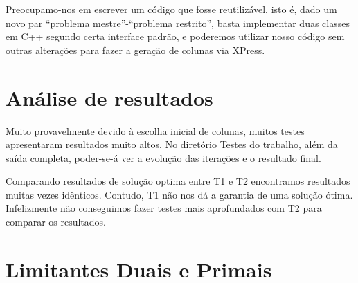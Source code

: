 \documentclass[letterpaper,11pt]{article}
\begin{document}
Preocupamo-nos em escrever um código que fosse reutilizável, isto é,
dado um novo par ``problema mestre''-``problema restrito'', basta
implementar duas classes em C++ segundo certa interface padrão, e
poderemos utilizar nosso código sem outras alterações para fazer a
geração de colunas via XPress.

\section{Análise de resultados}
Muito provavelmente devido à escolha inicial de colunas, muitos testes
apresentaram resultados muito altos. No diretório Testes do trabalho,
além da saída completa, poder-se-á ver a evolução das iterações e o
resultado final. 

Comparando resultados de solução optima entre T1 e T2 encontramos
resultados muitas vezes idênticos. Contudo, T1 não nos dá a garantia de
uma solução ótima. Infelizmente não conseguimos fazer testes mais
aprofundados com T2 para comparar os resultados.

\section{Limitantes Duais e Primais}
\end{document}
